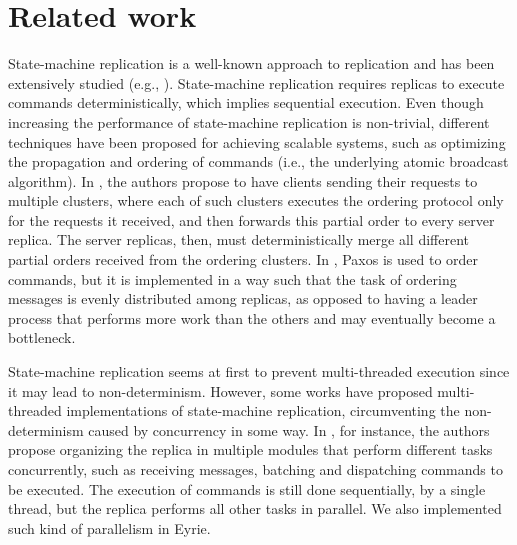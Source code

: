 \section{Related work}
\label{sec:related_work}

State-machine replication is a well-known approach to replication and has been extensively studied (e.g., \cite{Lam78, Sch90, santos2011htsmr, kotla2004htbft, kapritzos2012eve}). 
State-machine replication requires replicas to execute commands deterministically, which implies sequential execution. 
Even though increasing the performance of state-machine replication is non-trivial, different techniques have been proposed for achieving scalable systems, such as optimizing the propagation and ordering of commands (i.e., the underlying atomic broadcast algorithm). 
In \cite{kapritsos2010scalable}, the authors propose to have clients sending their requests to multiple clusters, where each of such clusters executes the ordering protocol only for the requests it received, and then forwards this partial order to every server replica. The server replicas, then, must deterministically merge all different partial orders received from the ordering clusters.
In \cite{biely2012spaxos}, Paxos \cite{Lam98} is used to order commands, but it is implemented in a way such that the task of ordering messages is evenly distributed among replicas, as opposed to having a leader process that performs more work than the others and may eventually become a bottleneck. 

State-machine replication seems at first to prevent multi-threaded execution since it may lead to non-determinism. 
However, some works have proposed multi-threaded implementations of state-machine replication, circumventing the non-determinism caused by concurrency in some way. 
In \cite{santos2011htsmr}, for instance, the authors propose organizing the replica in multiple modules that perform different tasks concurrently, such as receiving messages, batching and dispatching commands to be executed. 
The execution of commands is still done sequentially, by a single thread, but the replica performs all other tasks in parallel. We also implemented such kind of parallelism in Eyrie.

